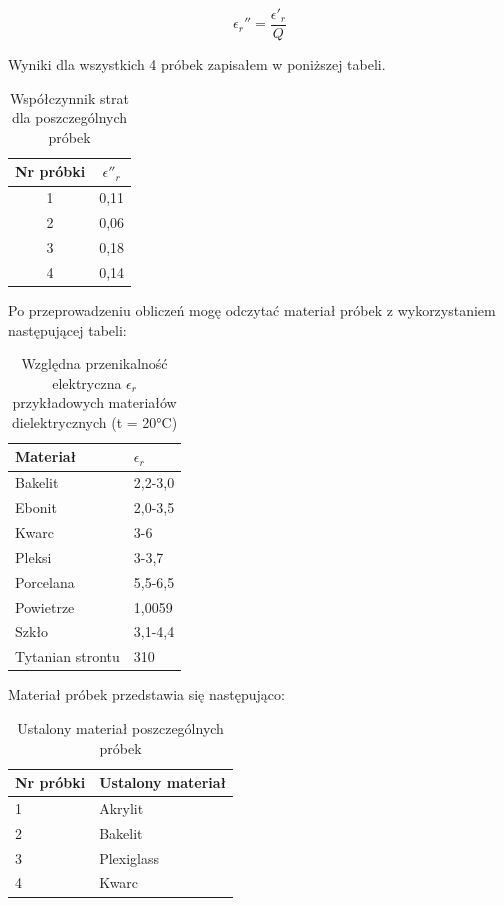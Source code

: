 \documentclass[polish, a4paper]{article}
\begin{document}
\begin{equation}
\epsilon_r'' = \frac{\epsilon'_r}{Q}
\end{equation}

Wyniki dla wszystkich 4 próbek zapisałem w poniższej tabeli.

\begin{table}[H]
    \centering
    \begin{tabular}{|c|c|}
    \hline
        \textbf{Nr próbki} & \textbf{$\epsilon''_r$} \\ \hline
        1 & 0,11 \\ \hline
        2 & 0,06 \\ \hline
        3 & 0,18 \\ \hline
        4 & 0,14 \\ \hline
    \end{tabular}
    \caption{Współczynnik strat dla poszczególnych próbek}
\end{table}

Po przeprowadzeniu obliczeń mogę odczytać materiał próbek z wykorzystaniem następującej tabeli:

\begin{table}[H]
    \centering
    \begin{tabular}{|l|l|}
    \hline
        \textbf{Materiał} & $\epsilon_r$ \\ \hline
        Bakelit & 2,2-3,0 \\ \hline
        Ebonit & 2,0-3,5 \\ \hline
        Kwarc & 3-6 \\ \hline
        Pleksi & 3-3,7 \\ \hline
        Porcelana & 5,5-6,5 \\ \hline
        Powietrze & 1,0059 \\ \hline
        Szkło & 3,1-4,4 \\ \hline
        Tytanian strontu & 310 \\ \hline
    \end{tabular}
    \caption{Względna przenikalność elektryczna $\epsilon_r$ przykładowych materiałów dielektrycznych (t = 20°C)}
\end{table}

Materiał próbek przedstawia się następująco:

\begin{table}[H]
    \centering
    \begin{tabular}{|l|l|}
    \hline
        \textbf{Nr próbki} & \textbf{Ustalony materiał} \\ \hline
        1 & Akrylit \\ \hline
        2 & Bakelit \\ \hline
        3 & Plexiglass \\ \hline
        4 & Kwarc \\ \hline
    \end{tabular}
    \caption{Ustalony materiał poszczególnych próbek}
\end{table}
\end{document}
